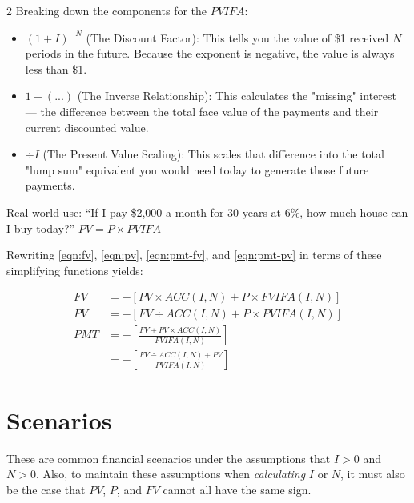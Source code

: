 \documentclass[11pt]{article}%
\begin{document}
\begin{multicols*}{2}
Breaking down the components for the $PVIFA$:

\begin{itemize}
\item $\left(1+I\right)^{-N}$ (The Discount Factor): This tells you the value of \$1 received $N$ periods in the future. Because the exponent is negative, the value is always less than \$1.

\item $1-(...)$ (The Inverse Relationship): This calculates the "missing" interest --- the difference between the total face value of the payments and their current discounted value.

\item $\div I$ (The Present Value Scaling): This scales that difference into the total "lump sum" equivalent you would need today to generate those future payments.
\end{itemize}

Real-world use: ``If I pay \$2,000 a month for 30 years at 6\%, how much house can I buy today?'' $PV = P \times PVIFA$

Rewriting \eqref{eqn:fv}, \eqref{eqn:pv}, \eqref{eqn:pmt-fv}, and \eqref{eqn:pmt-pv} in terms of these simplifying functions yields:

\begin{align}
FV &= -\left[ PV \times ACC(I, N) + P \times FVIFA(I, N) \right] \\
PV &= -\left[ FV \div ACC(I, N) + P \times PVIFA(I, N) \right] \\
PMT &= -\left[ \frac{FV + PV \times ACC(I, N)}{FVIFA(I, N)} \right] \\
 &= -\left[ \frac{FV \div ACC(I, N) + PV}{PVIFA(I, N)} \right]
\end{align}

\section{Scenarios}\label{sec:scenarios}

These are common financial scenarios under the assumptions that $I > 0$ and $N > 0$. Also, to maintain these assumptions when \textit{calculating} $I$ or $N$, it must also be the case that $PV$, $P$, and $FV$ cannot all have the same sign. 

\end{multicols*}
\end{document}
